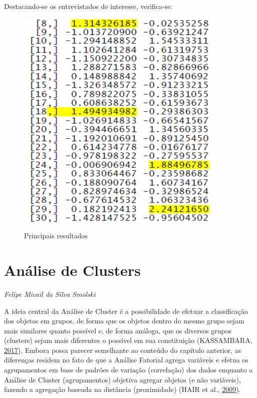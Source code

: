 \documentclass[12pt,brazil,oneside]{book}
\begin{document}
Destacando-se os entrevistados de interesse, verifica-se:

\begin{figure}[H]

{\centering \includegraphics[width=0.8\linewidth]{anfat2} 

}

\caption{Principais resultados}\label{fig:unnamed-chunk-34}
\end{figure}

\hypertarget{analise-de-clusters}{%
\chapter{Análise de Clusters}\label{analise-de-clusters}}

\emph{Felipe Micail da Silva Smolski}

A ideia central da Análise de Cluster é a possibilidade de efetuar a classificação dos objetos em grupos, de forma que os objetos dentro do mesmo grupo sejam mais similares quanto possível e, de forma análoga, que os diversos grupos (clusters) sejam mais diferentes o possível em sua constituição (KASSAMBARA, \protect\hyperlink{ref-Kassambara2017}{2017}). Embora possa parecer semelhante ao conteúdo do capítulo anterior, as diferenças residem no fato de que a Análise Fatorial agrega variáveis e efetua os agrupamentos em base de padrões de variação (correlação) dos dados enquanto a Análise de Cluster (agrupamentos) objetiva agregar objetos (e não variáveis), fazendo a agregação baseada na distância (proximidade) (HAIR et al., \protect\hyperlink{ref-Hair2009}{2009}).
\end{document}
